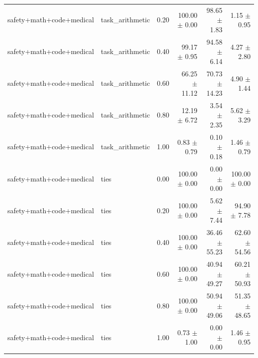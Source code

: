 \documentclass{article}
\begin{document}
\begin{table}[H]
{\begin{tabular}{lllrrr}
safety+math+code+medical & task\_arithmetic & 0.20 & 100.00 $\pm$ 0.00 & 98.65 $\pm$ 1.83 & 1.15 $\pm$ 0.95 \\
safety+math+code+medical & task\_arithmetic & 0.40 & 99.17 $\pm$ 0.95 & 94.58 $\pm$ 6.14 & 4.27 $\pm$ 2.80 \\
safety+math+code+medical & task\_arithmetic & 0.60 & 66.25 $\pm$ 11.12 & 70.73 $\pm$ 14.23 & 4.90 $\pm$ 1.44 \\
safety+math+code+medical & task\_arithmetic & 0.80 & 12.19 $\pm$ 6.72 & 3.54 $\pm$ 2.35 & 5.62 $\pm$ 3.29 \\
safety+math+code+medical & task\_arithmetic & 1.00 & 0.83 $\pm$ 0.79 & 0.10 $\pm$ 0.18 & 1.46 $\pm$ 0.79 \\
safety+math+code+medical & ties & 0.00 & 100.00 $\pm$ 0.00 & 0.00 $\pm$ 0.00 & 100.00 $\pm$ 0.00 \\
safety+math+code+medical & ties & 0.20 & 100.00 $\pm$ 0.00 & 5.62 $\pm$ 7.44 & 94.90 $\pm$ 7.78 \\
safety+math+code+medical & ties & 0.40 & 100.00 $\pm$ 0.00 & 36.46 $\pm$ 55.23 & 62.60 $\pm$ 54.56 \\
safety+math+code+medical & ties & 0.60 & 100.00 $\pm$ 0.00 & 40.94 $\pm$ 49.27 & 60.21 $\pm$ 50.93 \\
safety+math+code+medical & ties & 0.80 & 100.00 $\pm$ 0.00 & 50.94 $\pm$ 49.06 & 51.35 $\pm$ 48.65 \\
safety+math+code+medical & ties & 1.00 & 0.73 $\pm$ 1.00 & 0.00 $\pm$ 0.00 & 1.46 $\pm$ 0.95 \\
\bottomrule
\end{tabular}
}
\end{table}
\end{document}
